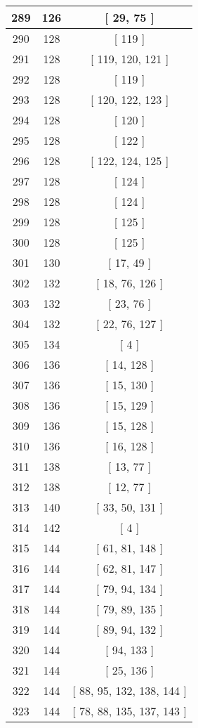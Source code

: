 \begin{center}
\begin{longtable}[H]{|| c c c ||}
\hline
289 & 126 & [ 29, 75 ] \\ 
\hline
290 & 128 & [ 119 ] \\ 
\hline
291 & 128 & [ 119, 120, 121 ] \\ 
\hline
292 & 128 & [ 119 ] \\ 
\hline
293 & 128 & [ 120, 122, 123 ] \\ 
\hline
294 & 128 & [ 120 ] \\ 
\hline
295 & 128 & [ 122 ] \\ 
\hline
296 & 128 & [ 122, 124, 125 ] \\ 
\hline
297 & 128 & [ 124 ] \\ 
\hline
298 & 128 & [ 124 ] \\ 
\hline
299 & 128 & [ 125 ] \\ 
\hline
300 & 128 & [ 125 ] \\ 
\hline
301 & 130 & [ 17, 49 ] \\ 
\hline
302 & 132 & [ 18, 76, 126 ] \\ 
\hline
303 & 132 & [ 23, 76 ] \\ 
\hline
304 & 132 & [ 22, 76, 127 ] \\ 
\hline
305 & 134 & [ 4 ] \\ 
\hline
306 & 136 & [ 14, 128 ] \\ 
\hline
307 & 136 & [ 15, 130 ] \\ 
\hline
308 & 136 & [ 15, 129 ] \\ 
\hline
309 & 136 & [ 15, 128 ] \\ 
\hline
310 & 136 & [ 16, 128 ] \\ 
\hline
311 & 138 & [ 13, 77 ] \\ 
\hline
312 & 138 & [ 12, 77 ] \\ 
\hline
313 & 140 & [ 33, 50, 131 ] \\ 
\hline
314 & 142 & [ 4 ] \\ 
\hline
315 & 144 & [ 61, 81, 148 ] \\ 
\hline
316 & 144 & [ 62, 81, 147 ] \\ 
\hline
317 & 144 & [ 79, 94, 134 ] \\ 
\hline
318 & 144 & [ 79, 89, 135 ] \\ 
\hline
319 & 144 & [ 89, 94, 132 ] \\ 
\hline
320 & 144 & [ 94, 133 ] \\ 
\hline
321 & 144 & [ 25, 136 ] \\ 
\hline
322 & 144 & [ 88, 95, 132, 138, 144 ] \\ 
\hline
323 & 144 & [ 78, 88, 135, 137, 143 ] \\ 

\end{longtable}
\end{center}
